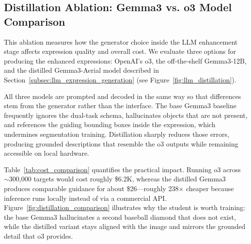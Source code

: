 \subsection{Distillation Ablation: Gemma3 vs. o3 Model Comparison}
\label{subsec:distillation_ablation}

This ablation measures how the generator choice inside the LLM enhancement stage affects expression quality and overall cost. We evaluate three options for producing the enhanced expressions: OpenAI’s o3, the off‑the‑shelf Gemma3‑12B, and the distilled Gemma3-Aerial model described in Section~\ref{subsec:llm_expression_generation} (see Figure~\ref{fig:llm_distillation}).

All three models are prompted and decoded in the same way so that differences stem from the generator rather than the interface. The base Gemma3 baseline frequently ignores the dual-task schema, hallucinates objects that are not present, and references the guiding bounding boxes inside the expression, which undermines segmentation training. Distillation sharply reduces those errors, producing grounded descriptions that resemble the o3 outputs while remaining accessible on local hardware.

Table~\ref{tab:cost_comparison} quantifies the practical impact. Running o3 across \(\sim\)300{,}000 targets would cost roughly \$6.2K, whereas the distilled Gemma3 produces comparable guidance for about \$26—roughly 238× cheaper because inference runs locally instead of via a commercial API. Figure~\ref{fig:distillation_comparison} illustrates why the student is worth training: the base Gemma3 hallucinates a second baseball diamond that does not exist, while the distilled variant stays aligned with the image and mirrors the grounded detail that o3 provides.

\begin{table}[t]
\centering
\caption{Cost Analysis: Gemma3 vs. o3 Model for Large-Scale Annotation\protect\footnotemark}
\label{tab:cost_comparison}
\end{table}

